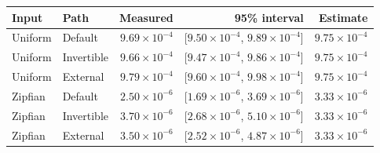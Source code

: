 \begin{tabular}{@{}llrrr@{}}
\toprule
\textbf{Input} & \textbf{Path} & \textbf{Measured} & \textbf{95\% interval} & \textbf{Estimate} \\
\midrule
Uniform & Default & $9.69\times10^{-4}$ & [$9.50\times10^{-4}$, $9.89\times10^{-4}$] & $9.75\times10^{-4}$ \\
Uniform & Invertible & $9.66\times10^{-4}$ & [$9.47\times10^{-4}$, $9.86\times10^{-4}$] & $9.75\times10^{-4}$ \\
Uniform & External & $9.79\times10^{-4}$ & [$9.60\times10^{-4}$, $9.98\times10^{-4}$] & $9.75\times10^{-4}$ \\
Zipfian & Default & $2.50\times10^{-6}$ & [$1.69\times10^{-6}$, $3.69\times10^{-6}$] & $3.33\times10^{-6}$ \\
Zipfian & Invertible & $3.70\times10^{-6}$ & [$2.68\times10^{-6}$, $5.10\times10^{-6}$] & $3.33\times10^{-6}$ \\
Zipfian & External & $3.50\times10^{-6}$ & [$2.52\times10^{-6}$, $4.87\times10^{-6}$] & $3.33\times10^{-6}$ \\
\bottomrule
\end{tabular}
